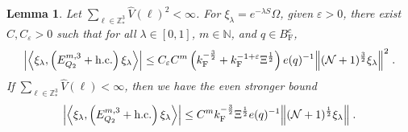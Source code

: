 \documentclass[12pt,a4paper]{article}
\numberwithin{equation}{section}
\newcommand{\NNN}{\mathbb{N}}
\newcommand{\1}{\mathbb{I}}
\newcommand{\F}{\mathrm{F}}
\newcommand{\Z}{\mathbb{Z}}
\newcommand{\NN}{\mathcal{N}}
\newcommand{\half}{\frac{1}{2}}
\newcommand{\eva}[1]{\left\langle #1 \right\rangle}
\theoremstyle{plain}
\newtheorem{lemma}[theorem]{Lemma}
\theoremstyle{definition}
\theoremstyle{remark}
\theoremstyle{plain}
\theoremstyle{definition}
\theoremstyle{remark}
\begin{document}
\begin{lemma} \label{lem:EQ215}
Let $ \sum_{\ell \in \Z^3_*} \hat{V}(\ell)^2 < \infty $. For $\xi_\lambda = e^{-\lambda S} \Omega$, given $ \varepsilon > 0 $, there exist $ C, C_\varepsilon > 0 $ such that for all $ \lambda \in [0,1] $, $ m \in \NNN $, and $ q \in B_{\F}^c $,
\begin{align} \label{eq:estEQ215_Coulomb}
	\abs{\eva{\xi_\lambda,\left(E^{m,3}_{Q_2}+\mathrm{h.c.}\right) \xi_\lambda }}
	\leq C_\varepsilon C^m \left( k_{\F}^{-\frac 32}
		+ k_{\F}^{-1 + \varepsilon} \Xi^\half \right)
		e(q)^{-1}
		\norm{(\NN+1)^{\frac 32} \xi_\lambda }^2 \;.
\end{align}
If $ \sum_{\ell \in \Z^3_*} \hat{V}(\ell) < \infty $, then we have the even stronger bound
\begin{align} \label{eq:estEQ215}
	\abs{\eva{\xi_\lambda,\left(E^{m,3}_{Q_2}+\mathrm{h.c.}\right) \xi_\lambda }}
	\leq C^m k_{\F}^{-\frac{3}{2}} \Xi^{\half} e(q)^{-1}
		\norm{(\NN+1)^\half \xi_\lambda } \;.
\end{align}
\end{lemma}
\end{document}
